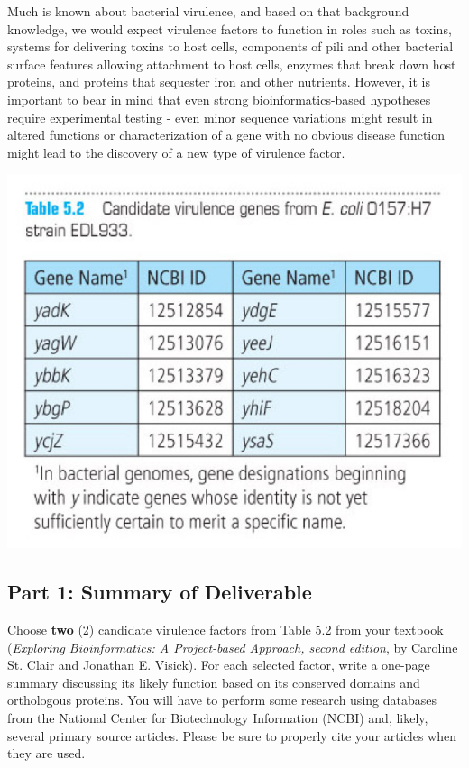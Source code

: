 Much is known about bacterial virulence, and based on that background knowledge, we would expect virulence factors to function in roles such as toxins, systems for delivering toxins to host cells, components of pili and other bacterial surface features allowing attachment to host cells, enzymes that break down host proteins, and proteins that sequester iron and other nutrients.  However, it is important to bear in mind that even strong bioinformatics-based hypotheses require experimental testing - even minor sequence variations might result in altered functions or characterization of a gene with no obvious disease function might lead to the discovery of a new type of virulence factor.

\includegraphics[scale=1]{table}


\vspace*{-.1in}
\subsection*{Part 1: Summary of Deliverable}
\vspace*{-.1in} 

Choose \textbf{two}  (2) candidate virulence factors from Table 5.2 from your textbook (\emph{Exploring Bioinformatics: A Project-based Approach, second edition}, by Caroline St. Clair and Jonathan E. Visick).  For each selected factor, write a one-page summary discussing its likely function based on its conserved domains and orthologous proteins. You will have to perform some research using databases from the National Center for Biotechnology Information (NCBI) and, likely, several primary source articles. Please be sure to properly cite your articles when they are used.

